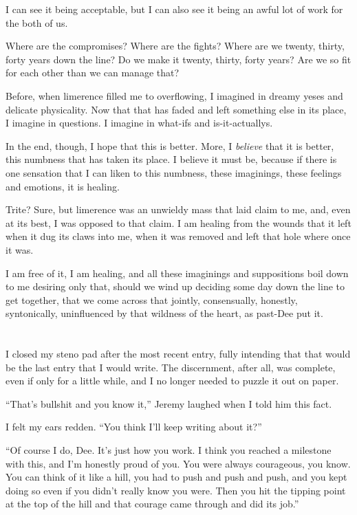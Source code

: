 I can see it being acceptable, but I can also see it being an awful lot of work for the both of us.

Where are the compromises? Where are the fights? Where are we twenty, thirty, forty years down the line? Do we make it twenty, thirty, forty years? Are we so fit for each other than we can manage that?

Before, when limerence filled me to overflowing, I imagined in dreamy yeses and delicate physicality. Now that that has faded and left something else in its place, I imagine in questions. I imagine in what-ifs and is-it-actuallys.

In the end, though, I hope that this is better. More, I \emph{believe} that it is better, this numbness that has taken its place. I believe it must be, because if there is one sensation that I can liken to this numbness, these imaginings, these feelings and emotions, it is healing.

Trite? Sure, but limerence was an unwieldy mass that laid claim to me, and, even at its best, I was opposed to that claim. I am healing from the wounds that it left when it dug its claws into me, when it was removed and left that hole where once it was.

I am free of it, I am healing, and all these imaginings and suppositions boil down to me desiring only that, should we wind up deciding some day down the line to get together, that we come across that jointly, consensually, honestly, syntonically, uninfluenced by that wildness of the heart, as past-Dee put it.

\section{}

I closed my steno pad after the most recent entry, fully intending that that would be the last entry that I would write. The discernment, after all, was complete, even if only for a little while, and I no longer needed to puzzle it out on paper.

``That's bullshit and you know it,'' Jeremy laughed when I told him this fact.

I felt my ears redden. ``You think I'll keep writing about it?''

``Of course I do, Dee. It's just how you work. I think you reached a milestone with this, and I'm honestly proud of you. You were always courageous, you know. You can think of it like a hill, you had to push and push and push, and you kept doing so even if you didn't really know you were. Then you hit the tipping point at the top of the hill and that courage came through and did its job.''


